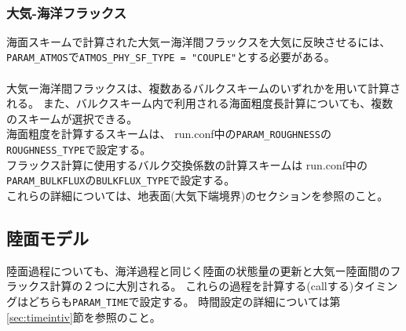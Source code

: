 \\

\subsubsection{大気-海洋フラックス}
海面スキームで計算された大気ー海洋間フラックスを大気に反映させるには、\verb|PARAM_ATMOS|で\verb|ATMOS_PHY_SF_TYPE = "COUPLE"|とする必要がある。\\

\\

大気ー海洋間フラックスは、複数あるバルクスキームのいずれかを用いて計算される。
また、バルクスキーム内で利用される海面粗度長計算についても、複数のスキームが選択できる。\\

海面粗度を計算するスキームは、
run.conf中の\verb|PARAM_ROUGHNESS|の\verb|ROUGHNESS_TYPE|で設定する。\\

フラックス計算に使用するバルク交換係数の計算スキームは
run.conf中の\verb|PARAM_BULKFLUX|の\verb|BULKFLUX_TYPE|で設定する。\\

これらの詳細については、地表面(大気下端境界)のセクションを参照のこと。



\subsection{陸面モデル} \label{sec:basic_land}
陸面過程についても、海洋過程と同じく陸面の状態量の更新と大気ー陸面間のフラックス計算の２つに大別される。
これらの過程を計算する(callする)タイミングはどちらも\verb|PARAM_TIME|で設定する。
時間設定の詳細については第\ref{sec:timeintiv}節を参照のこと。\\


